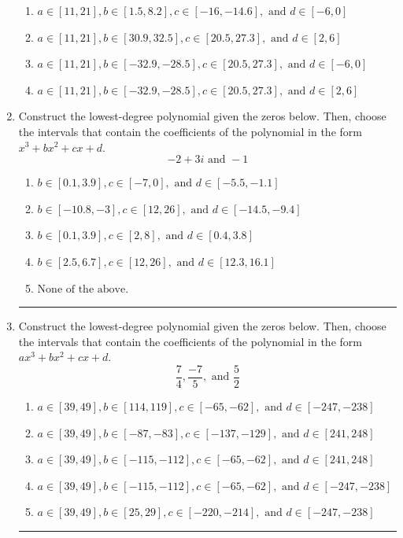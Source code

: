 \documentclass[14pt]{extbook}
\newcommand{\litem}[1]{\item#1\hspace*{-1cm}\rule{\textwidth}{0.4pt}}
\begin{document}
\begin{enumerate}
{\begin{enumerate}[label=\Alph*.]
\item \( a \in [11, 21], b \in [1.5, 8.2], c \in [-16, -14.6], \text{ and } d \in [-6, 0] \)
\item \( a \in [11, 21], b \in [30.9, 32.5], c \in [20.5, 27.3], \text{ and } d \in [2, 6] \)
\item \( a \in [11, 21], b \in [-32.9, -28.5], c \in [20.5, 27.3], \text{ and } d \in [-6, 0] \)
\item \( a \in [11, 21], b \in [-32.9, -28.5], c \in [20.5, 27.3], \text{ and } d \in [2, 6] \)

\end{enumerate} }
\litem{
Construct the lowest-degree polynomial given the zeros below. Then, choose the intervals that contain the coefficients of the polynomial in the form $x^3+bx^2+cx+d$.\[ -2 + 3 i \text{ and } -1 \]\begin{enumerate}[label=\Alph*.]
\item \( b \in [0.1, 3.9], c \in [-7, 0], \text{ and } d \in [-5.5, -1.1] \)
\item \( b \in [-10.8, -3], c \in [12, 26], \text{ and } d \in [-14.5, -9.4] \)
\item \( b \in [0.1, 3.9], c \in [2, 8], \text{ and } d \in [0.4, 3.8] \)
\item \( b \in [2.5, 6.7], c \in [12, 26], \text{ and } d \in [12.3, 16.1] \)
\item \( \text{None of the above.} \)

\end{enumerate} }
\litem{
Construct the lowest-degree polynomial given the zeros below. Then, choose the intervals that contain the coefficients of the polynomial in the form $ax^3+bx^2+cx+d$.\[ \frac{7}{4}, \frac{-7}{5}, \text{ and } \frac{5}{2} \]\begin{enumerate}[label=\Alph*.]
\item \( a \in [39, 49], b \in [114, 119], c \in [-65, -62], \text{ and } d \in [-247, -238] \)
\item \( a \in [39, 49], b \in [-87, -83], c \in [-137, -129], \text{ and } d \in [241, 248] \)
\item \( a \in [39, 49], b \in [-115, -112], c \in [-65, -62], \text{ and } d \in [241, 248] \)
\item \( a \in [39, 49], b \in [-115, -112], c \in [-65, -62], \text{ and } d \in [-247, -238] \)
\item \( a \in [39, 49], b \in [25, 29], c \in [-220, -214], \text{ and } d \in [-247, -238] \)


\end{enumerate}}
\end{enumerate}
\end{document}
